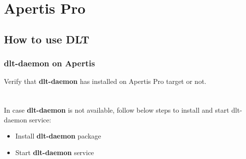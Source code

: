 %
%
%
\chapter{Apertis Pro}
\section{How to use DLT}

\subsection{dlt-daemon on Apertis}
Verify that \textbf{dlt-daemon} has installed on Apertis Pro target or not.\\
\\
\\
In case \textbf{dlt-daemon} is not available, follow below steps to install and 
start dlt-daemon service:
\begin{itemize}
   \item Install \textbf{dlt-daemon} package\\
   \item Start \textbf{dlt-daemon} service\\
\end{itemize}

